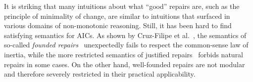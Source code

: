 \documentclass[runningheads]{llncs}
\begin{document}

It is striking that many intuitions about what ``good'' repairs are, such as the principle of minimality of change, are similar to intuitions that surfaced in various domains of non-monotonic reasoning. %
Still, it has been hard to find satisfying semantics for AICs.
As shown by Cruz-Filipe et al.\ \cite{tase/Cruz-FilipeGEN13}, the semantics of so-called \emph{founded repairs}~\cite{iclp/CaropreseGSZ06} unexpectedly fails to respect the common-sense law of inertia, while the more restricted semantics of justified repairs~\cite{tplp/CaropreseT11} forbids natural repairs in some cases. On the other hand, well-founded repairs are not modular~\cite{foiks/Cruz-Filipe14} and therefore severely restricted in their practical applicability.

\end{document}
